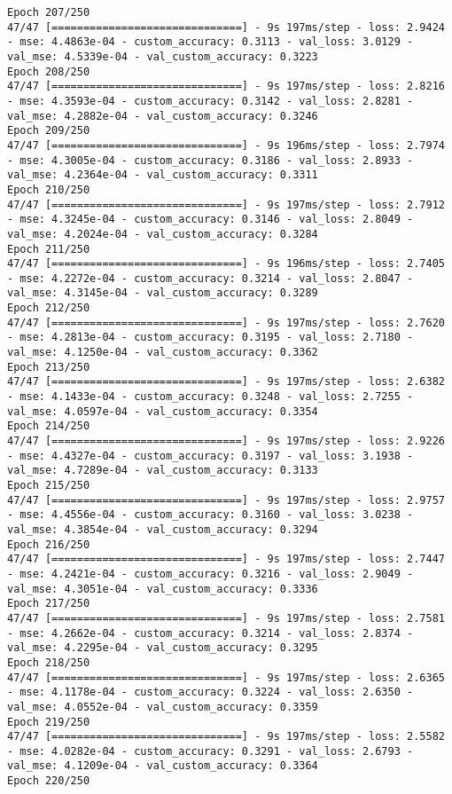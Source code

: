 \begin{lstlisting}
Epoch 207/250
47/47 [==============================] - 9s 197ms/step - loss: 2.9424 - mse: 4.4863e-04 - custom_accuracy: 0.3113 - val_loss: 3.0129 - val_mse: 4.5339e-04 - val_custom_accuracy: 0.3223
Epoch 208/250
47/47 [==============================] - 9s 197ms/step - loss: 2.8216 - mse: 4.3593e-04 - custom_accuracy: 0.3142 - val_loss: 2.8281 - val_mse: 4.2882e-04 - val_custom_accuracy: 0.3246
Epoch 209/250
47/47 [==============================] - 9s 196ms/step - loss: 2.7974 - mse: 4.3005e-04 - custom_accuracy: 0.3186 - val_loss: 2.8933 - val_mse: 4.2364e-04 - val_custom_accuracy: 0.3311
Epoch 210/250
47/47 [==============================] - 9s 197ms/step - loss: 2.7912 - mse: 4.3245e-04 - custom_accuracy: 0.3146 - val_loss: 2.8049 - val_mse: 4.2024e-04 - val_custom_accuracy: 0.3284
Epoch 211/250
47/47 [==============================] - 9s 196ms/step - loss: 2.7405 - mse: 4.2272e-04 - custom_accuracy: 0.3214 - val_loss: 2.8047 - val_mse: 4.3145e-04 - val_custom_accuracy: 0.3289
Epoch 212/250
47/47 [==============================] - 9s 197ms/step - loss: 2.7620 - mse: 4.2813e-04 - custom_accuracy: 0.3195 - val_loss: 2.7180 - val_mse: 4.1250e-04 - val_custom_accuracy: 0.3362
Epoch 213/250
47/47 [==============================] - 9s 197ms/step - loss: 2.6382 - mse: 4.1433e-04 - custom_accuracy: 0.3248 - val_loss: 2.7255 - val_mse: 4.0597e-04 - val_custom_accuracy: 0.3354
Epoch 214/250
47/47 [==============================] - 9s 197ms/step - loss: 2.9226 - mse: 4.4327e-04 - custom_accuracy: 0.3197 - val_loss: 3.1938 - val_mse: 4.7289e-04 - val_custom_accuracy: 0.3133
Epoch 215/250
47/47 [==============================] - 9s 197ms/step - loss: 2.9757 - mse: 4.4556e-04 - custom_accuracy: 0.3160 - val_loss: 3.0238 - val_mse: 4.3854e-04 - val_custom_accuracy: 0.3294
Epoch 216/250
47/47 [==============================] - 9s 197ms/step - loss: 2.7447 - mse: 4.2421e-04 - custom_accuracy: 0.3216 - val_loss: 2.9049 - val_mse: 4.3051e-04 - val_custom_accuracy: 0.3336
Epoch 217/250
47/47 [==============================] - 9s 197ms/step - loss: 2.7581 - mse: 4.2662e-04 - custom_accuracy: 0.3214 - val_loss: 2.8374 - val_mse: 4.2295e-04 - val_custom_accuracy: 0.3295
Epoch 218/250
47/47 [==============================] - 9s 197ms/step - loss: 2.6365 - mse: 4.1178e-04 - custom_accuracy: 0.3224 - val_loss: 2.6350 - val_mse: 4.0552e-04 - val_custom_accuracy: 0.3359
Epoch 219/250
47/47 [==============================] - 9s 197ms/step - loss: 2.5582 - mse: 4.0282e-04 - custom_accuracy: 0.3291 - val_loss: 2.6793 - val_mse: 4.1209e-04 - val_custom_accuracy: 0.3364
Epoch 220/250

\end{lstlisting}
